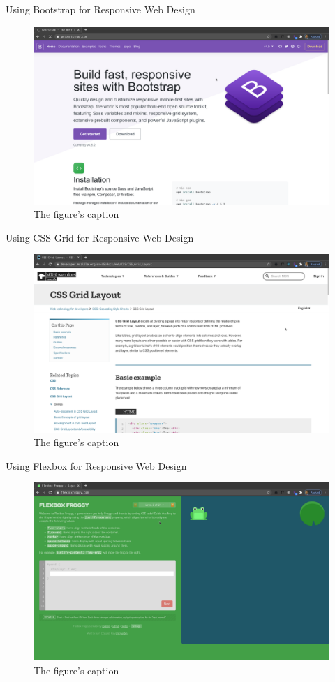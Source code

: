 \documentclass[14pt,aspectratio=169]{beamer}
\begin{document}
%
\begin{frame}{Using Bootstrap for Responsive Web Design}
  \begin{figure}
    \centering
    \includegraphics[scale=.085]{images/bootstrap-site.png}
    \caption{The figure's caption}
  \end{figure}
\end{frame}

%
\begin{frame}{Using CSS Grid for Responsive Web Design}
  \begin{figure}
    \centering
    \includegraphics[scale=.085]{images/cssgrid-site.png}
    \caption{The figure's caption}
  \end{figure}
\end{frame}

%
\begin{frame}{Using Flexbox for Responsive Web Design}
  \begin{figure}
    \centering
    \includegraphics[scale=.085]{images/flexboxfroggy-site.png}
    \caption{The figure's caption}
  \end{figure}
\end{frame}
\end{document}
